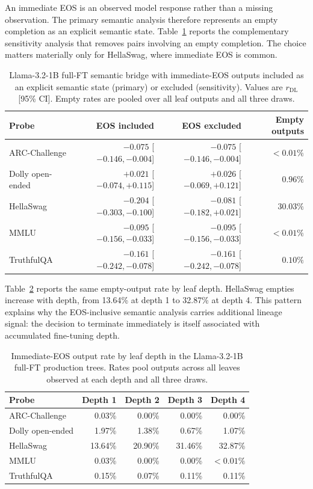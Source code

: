 \documentclass{article}
\theoremstyle{definition}
\theoremstyle{plain}
\begin{document}
An immediate EOS is an observed model response rather than a missing observation. The primary semantic
analysis therefore represents an empty completion as an explicit semantic state. Table~\ref{tab:eos-sensitivity}
reports the complementary sensitivity analysis that removes pairs involving an empty completion. The choice
matters materially only for HellaSwag, where immediate EOS is common.

\begin{table}[h]
\caption{Llama-3.2-1B full-FT semantic bridge with immediate-EOS outputs included as an explicit
  semantic state (primary) or excluded (sensitivity). Values are $r_{\mathrm{DL}}$ [95\% CI]. Empty
  rates are pooled over all leaf outputs and all three draws.}
\label{tab:eos-sensitivity}
\centering
\small
\begin{tabular}{lrrr}
\toprule
Probe & EOS included & EOS excluded & Empty outputs \\
\midrule
ARC-Challenge & $-0.075$ [$-0.146,-0.004$] & $-0.075$ [$-0.146,-0.004$] & $<0.01\%$ \\
Dolly open-ended & $+0.021$ [$-0.074,+0.115$] & $+0.026$ [$-0.069,+0.121$] & $0.96\%$ \\
HellaSwag & $-0.204$ [$-0.303,-0.100$] & $-0.081$ [$-0.182,+0.021$] & $30.03\%$ \\
MMLU & $-0.095$ [$-0.156,-0.033$] & $-0.095$ [$-0.156,-0.033$] & $<0.01\%$ \\
TruthfulQA & $-0.161$ [$-0.242,-0.078$] & $-0.161$ [$-0.242,-0.078$] & $0.10\%$ \\
\bottomrule
\end{tabular}
\end{table}

Table~\ref{tab:eos-depth} reports the same empty-output rate by leaf depth. HellaSwag empties increase
with depth, from 13.64\% at depth 1 to 32.87\% at depth 4. This pattern explains why the EOS-inclusive
semantic analysis carries additional lineage signal: the decision to terminate immediately is itself
associated with accumulated fine-tuning depth.

\begin{table}[h]
\caption{Immediate-EOS output rate by leaf depth in the Llama-3.2-1B full-FT production trees. Rates
  pool outputs across all leaves observed at each depth and all three draws.}
\label{tab:eos-depth}
\centering
\small
\begin{tabular}{lrrrr}
\toprule
Probe & Depth 1 & Depth 2 & Depth 3 & Depth 4 \\
\midrule
ARC-Challenge & 0.03\% & 0.00\% & 0.00\% & 0.00\% \\
Dolly open-ended & 1.97\% & 1.38\% & 0.67\% & 1.07\% \\
HellaSwag & 13.64\% & 20.90\% & 31.46\% & 32.87\% \\
MMLU & 0.03\% & 0.00\% & 0.00\% & $<0.01\%$ \\
TruthfulQA & 0.15\% & 0.07\% & 0.11\% & 0.11\% \\
\bottomrule
\end{tabular}
\end{table}
\end{document}
